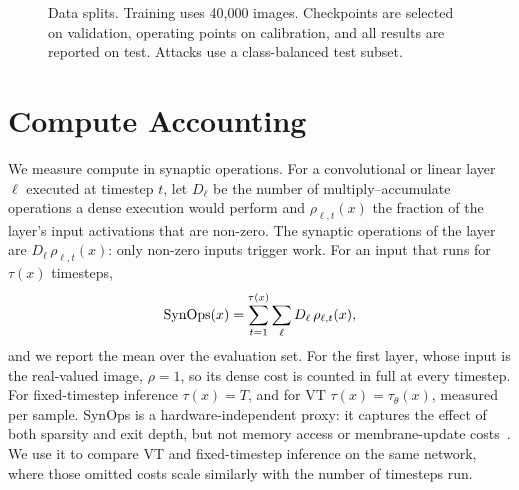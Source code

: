 \begin{figure}[htbp]
    \centering
    \caption[Data splits]{Data splits. Training uses 40{,}000 images. Checkpoints are selected on validation, operating points on calibration, and all results are reported on test. Attacks use a class-balanced test subset.}
    \label{fig:splits}
\end{figure}

\section{Compute Accounting}
\label{sec:meth-synops}

We measure compute in synaptic operations. For a convolutional or linear layer $\ell$ executed at timestep $t$, let $D_\ell$ be the number of multiply--accumulate operations a dense execution would perform and $\rho_{\ell,t}(x)$ the fraction of the layer's input activations that are non-zero. The synaptic operations of the layer are $D_\ell \, \rho_{\ell,t}(x)$: only non-zero inputs trigger work. For an input that runs for $\tau(x)$ timesteps,
\begin{equation}
    \mathrm{SynOps}(x) = \sum_{t=1}^{\tau(x)} \sum_{\ell} D_\ell \, \rho_{\ell,t}(x),
    \label{eq:synops}
\end{equation}
and we report the mean over the evaluation set. For the first layer, whose input is the real-valued image, $\rho = 1$, so its dense cost is counted in full at every timestep. For fixed-timestep inference $\tau(x) = T$, and for VT $\tau(x) = \tau_\theta(x)$, measured per sample. SynOps is a hardware-independent proxy: it captures the effect of both sparsity and exit depth, but not memory access or membrane-update costs~\cite{dampfhoffer2023snns}. We use it to compare VT and fixed-timestep inference on the same network, where those omitted costs scale similarly with the number of timesteps run.

